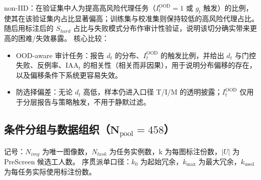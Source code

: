 non-IID：在验证集中人为提高高风险代理任务（$I_t^{\mathrm{OOD}}=1$ 或 $g_t$ 触发）的比例，使其在该验证集内占比显著偏高；训练集与校准集则保持较低的高风险代理占比。随后用标注后的 $S_{hard}$ 占比与失败模式分布作审计性验证，说明该切分确实带来更高的困难/失效暴露。
核心比较：
\begin{itemize}
    \item OOD-aware 审计任务：报告 $d_t$ 的分布、$I_t^{\mathrm{OOD}}$ 的触发比例，并给出 $d_t$ 与门控失败、反例率、$\mathrm{IAA}_t$ 的相关性（相关而非因果），用于说明分布偏移的存在，以及偏移条件下系统更容易失效。
    \item 防选择偏差：无论 $d_t$ 高低，样本仍进入口径 T/I/M 的透明披露；$I_t^{\mathrm{OOD}}$ 仅用于分层报告与策略触发，不用于静默过滤。
\end{itemize}
\subsection{条件分组与数据组织（$\mathbf{N}_{\mathrm{pool}}=458$）}\label{sec:exp-data-org}

记号：$N_{img}$ 为唯一图像数，$N_{task}$ 为任务实例数，k 为每图标注份数，$\left|U\right|$ 为 PreScreen 候选工人数。
\noindent 序贯派单口径：$k_0$ 为起始冗余，$k_{\max}$ 为最大冗余，$k_{\mathrm{used}}$ 为每任务实际使用标注份数。

